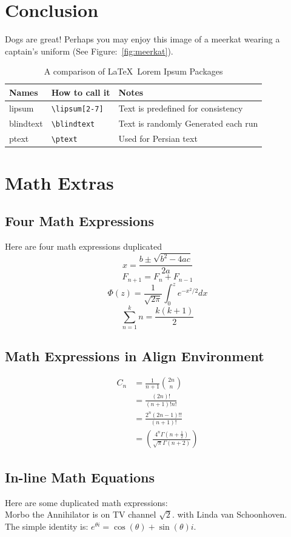 \documentclass[11pt]{article}
\begin{document}
\section{Conclusion}
Dogs are great!
Perhaps you may enjoy this image of a meerkat wearing a captain's uniform (See Figure:~\ref{fig:meerkat}).

\begin{table}[]
\centering
\caption{A comparison of \LaTeX\ Lorem Ipsum Packages}
\label{tbl:dastable}
\begin{tabular}{|l|ll|}
\hline
Names & How to call it & Notes \\ \hline
lipsum & \verb=\lipsum[2-7]= & Text is predefined for consistency \\
blindtext & \verb=\blindtext= & Text is randomly Generated each run \\
ptext & \verb=\ptext= & Used for Persian text \\ \hline
\end{tabular}
\end{table}


\section{Math Extras}
\subsection{Four Math Expressions}
Here are four math expressions duplicated
\[
x=\frac{b\pm\sqrt{b^2-4ac}}{2a}
\]
\[
F_{n+1}=F_{n}+F_{n-1}
\]
\[
\Phi(z)=\frac{1}{\sqrt{2\pi}}\int_{0}^z e^{-x^2/2}dx
\]
\[
\sum_{n=1}^{k} n=\frac{k(k+1)}{2}
\]
\subsection{Math Expressions in Align Environment}
\begin{align}
C_n&=\frac{1}{n+1}\binom{2n}{n} \\
&=\frac{(2n)!}{(n+1)!n!} \\
&=\frac{2^n(2n-1)!!}{(n+1)!} \\
&=\left ( \frac{4^n\Gamma(n+\frac{1}{2})}{\sqrt{\pi}\Gamma(n+2)} \right )
\end{align}
\subsection{In-line Math Equations}
Here are some duplicated math expressions:\\
\indent
Morbo the Annihilator is on TV channel $\sqrt{2}$. with Linda van Schoonhoven.\\
\indent
The simple identity is: $e^{\theta i} = \cos{(\theta)} + \sin{(\theta)}i$.


\end{document}
